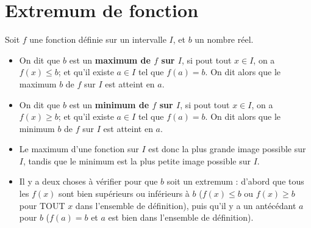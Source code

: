 \documentclass{poly}
\begin{document}
\section{Extremum de fonction}
\begin{definition}
Soit $f$ une fonction définie sur un intervalle $I$, et $b$ un nombre réel.
\begin{itemize}
\item On dit que $b$ est un \textbf{maximum de $f$ sur $I$}, si pout tout $x \in I$, on a $f(x) \leq b$; et qu'il existe $a \in I$ tel que $f(a) = b$. On dit alors que le maximum $b$ de $f$ sur $I$ est atteint en $a$.
\item On dit que $b$ est un \textbf{minimum de $f$ sur $I$}, si pout tout $x \in I$, on a $f(x) \geq b$; et qu'il existe $a \in I$ tel que $f(a) = b$. On dit alors que le minimum $b$ de $f$ sur $I$ est atteint en $a$.
\end{itemize}
\end{definition}
\begin{remark}
\hfill
\begin{itemize}
\item Le maximum d'une fonction sur $I$ est donc la plus grande image possible sur $I$, tandis que le minimum est la plus petite image possible sur $I$.
\item Il y a deux choses à vérifier pour que $b$ soit un extremum : d'abord que tous les $f(x)$ sont bien supérieurs ou inférieurs à $b$ ($f(x) \leq b$ ou $f(x) \geq b$ pour TOUT $x$ dans l'ensemble de définition), puis qu'il y a un antécédant $a$ pour $b$ ($f(a) = b$ et $a$ est bien dans l'ensemble de définition).
\end{itemize}
\end{remark}
\end{document}
